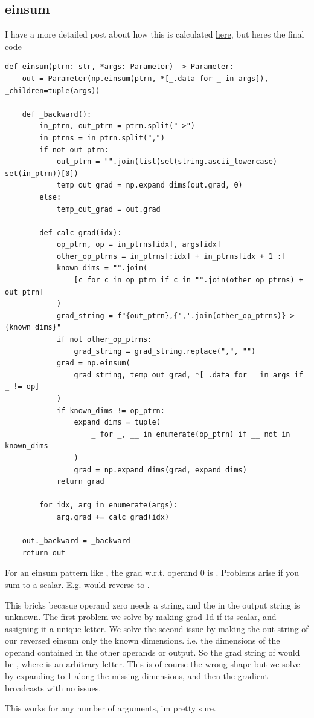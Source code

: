 \documentclass[11pt]{article}
\begin{document}
\subsection{einsum}
I have a more detailed post about how this is calculated \href{https://sammy-snipes.github.io/einsum-gradient/}{here}, but heres the final code 
\begin{verbatim}
def einsum(ptrn: str, *args: Parameter) -> Parameter:
    out = Parameter(np.einsum(ptrn, *[_.data for _ in args]), _children=tuple(args))

    def _backward():
        in_ptrn, out_ptrn = ptrn.split("->")
        in_ptrns = in_ptrn.split(",")
        if not out_ptrn:
            out_ptrn = "".join(list(set(string.ascii_lowercase) - set(in_ptrn))[0])
            temp_out_grad = np.expand_dims(out.grad, 0)
        else:
            temp_out_grad = out.grad

        def calc_grad(idx):
            op_ptrn, op = in_ptrns[idx], args[idx]
            other_op_ptrns = in_ptrns[:idx] + in_ptrns[idx + 1 :]
            known_dims = "".join(
                [c for c in op_ptrn if c in "".join(other_op_ptrns) + out_ptrn]
            )
            grad_string = f"{out_ptrn},{','.join(other_op_ptrns)}->{known_dims}"
            if not other_op_ptrns:
                grad_string = grad_string.replace(",", "")
            grad = np.einsum(
                grad_string, temp_out_grad, *[_.data for _ in args if _ != op]
            )
            if known_dims != op_ptrn:
                expand_dims = tuple(
                    _ for _, __ in enumerate(op_ptrn) if __ not in known_dims
                )
                grad = np.expand_dims(grad, expand_dims)
            return grad

        for idx, arg in enumerate(args):
            arg.grad += calc_grad(idx)

    out._backward = _backward
    return out
\end{verbatim}
For an einsum pattern like
, the grad w.r.t. operand 0 is . Problems arise if you sum to a scalar. E.g. 
 would reverse to . 
\par This bricks becasue operand zero needs a string, and the  in the output string is unknown.
The first problem we solve by making grad 1d if its scalar, and assigning it a unique letter. 
We solve the second issue by making the out string of our reversed einsum only the known dimensions. i.e. the dimensions of the operand contained in the other operands or output. So the grad string of  would be 
, where  is an arbitrary letter. 
This is of course the wrong shape but we solve by expanding to 1 along the missing dimensions,
and then the gradient broadcasts with no issues.
\par This works for any number of arguments, im pretty sure.
\end{document}

